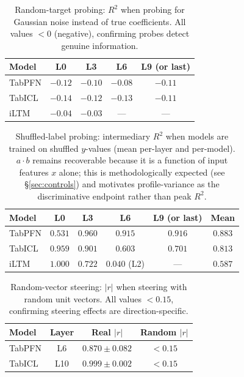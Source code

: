 \documentclass{article}
\begin{document}
\begin{table}[htbp]
\centering
\caption{Random-target probing: $R^2$ when probing for Gaussian noise instead of true coefficients. All values $< 0$ (negative), confirming probes detect genuine information.}
\label{tab:random-probe}
\small
\begin{tabular}{@{}l cccc@{}}
\toprule
Model & L0 & L3 & L6 & L9 (or last) \\
\midrule
TabPFN & $-0.12$ & $-0.10$ & $-0.08$ & $-0.11$ \\
TabICL & $-0.14$ & $-0.12$ & $-0.13$ & $-0.11$ \\
iLTM & $-0.04$ & $-0.03$ & --- & --- \\
\bottomrule
\end{tabular}
\end{table}

\begin{table}[htbp]
\centering
\caption{Shuffled-label probing: intermediary $R^2$ when models are trained on shuffled $y$-values (mean per-layer and per-model). $a{\cdot}b$ remains recoverable because it is a function of input features $x$ alone; this is methodologically expected (see \S\ref{sec:controls}) and motivates profile-variance as the discriminative endpoint rather than peak $R^2$.}
\label{tab:shuffled-probe}
\small
\begin{tabular}{@{}l ccccc@{}}
\toprule
Model & L0 & L3 & L6 & L9 (or last) & Mean \\
\midrule
TabPFN & $0.531$ & $0.960$ & $0.915$ & $0.916$ & $0.883$ \\
TabICL & $0.959$ & $0.901$ & $0.603$ & $0.701$ & $0.813$ \\
iLTM & $1.000$ & $0.722$ & $0.040$ (L2) & --- & $0.587$ \\
\bottomrule
\end{tabular}
\end{table}

\begin{table}[htbp]
\centering
\caption{Random-vector steering: $|r|$ when steering with random unit vectors. All values $<0.15$, confirming steering effects are direction-specific.}
\label{tab:random-steer}
\small
\begin{tabular}{@{}l ccc@{}}
\toprule
Model & Layer & Real $|r|$ & Random $|r|$ \\
\midrule
TabPFN & L6 & $0.870 \pm 0.082$ & $<0.15$ \\
TabICL & L10 & $0.999 \pm 0.002$ & $<0.15$ \\
\bottomrule
\end{tabular}
\end{table}
\end{document}
